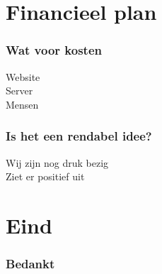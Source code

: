\documentclass[luatex,aspectratio=169,mathserif,serif]{beamer}
\begin{document}
  \section{Financieel plan}
	\begin{frame}
  		\frametitle{Wat voor kosten}
		Website \\
		Server \\
		Mensen
	\end{frame}
	\begin{frame}
		\frametitle{Is het een rendabel idee?}
		Wij zijn nog druk bezig\\
		Ziet er positief uit
	\end{frame}
  \section{Eind}
  	\begin{frame}
		\frametitle{Bedankt}
	\end{frame}
\end{document}
